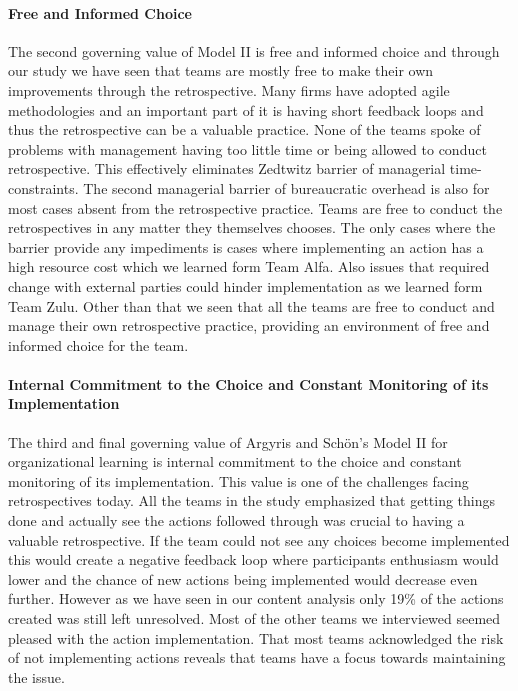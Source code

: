 \paragraph{Free and Informed Choice}
The second governing value of Model II is free and informed choice and through our study we have seen that teams are mostly free to make their own improvements through the retrospective. Many firms have adopted agile methodologies and an important part of it is having short feedback loops and thus the retrospective can be a valuable practice. None of the teams spoke of problems with management having too little time or being allowed to conduct retrospective. This effectively eliminates Zedtwitz\cite{Zedtwitz2002} barrier of managerial time-constraints. The second managerial barrier of bureaucratic overhead is also for most cases absent from the retrospective practice. Teams are free to conduct the retrospectives in any matter they themselves chooses. The only cases where the barrier provide any impediments is cases where implementing an action has a high resource cost which we learned form Team Alfa. Also issues that required change with external parties could hinder implementation as we learned form Team Zulu. Other than that we seen that all the teams are free to conduct and manage their own retrospective practice, providing an environment of free and informed choice for the team. 

\paragraph{Internal Commitment to the Choice and Constant Monitoring of its Implementation}
The third and final governing value of Argyris and Schön's Model II for organizational learning is internal commitment to the choice and constant monitoring of its implementation. This value is one of the challenges facing retrospectives today. All the teams in the study emphasized that getting things done and actually see the actions followed through was crucial to having a valuable retrospective. If the team could not see any choices become implemented this would create a negative feedback loop where participants enthusiasm would lower and the chance of new actions being implemented would decrease even further. However as we have seen in our content analysis only 19\% of the actions created was still left unresolved. Most of the other teams we interviewed seemed pleased with the action implementation. That most teams acknowledged the risk of not implementing actions reveals that teams have a focus towards maintaining the issue. 

